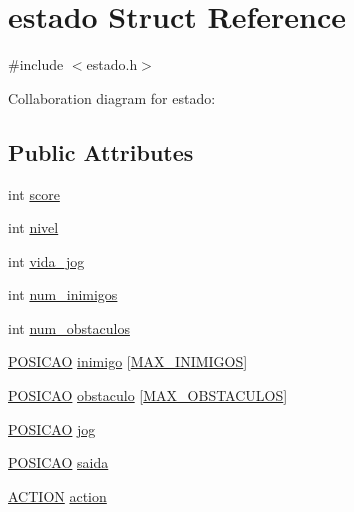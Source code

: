 \hypertarget{structestado}{}\section{estado Struct Reference}
\label{structestado}


{\ttfamily \#include $<$estado.\+h$>$}



Collaboration diagram for estado\+:
\subsection*{Public Attributes}
\begin{DoxyCompactItemize}
\item 
int \hyperlink{structestado_a47e99ef4241dfe72d9d68244a68adb46}{score}
\item 
int \hyperlink{structestado_a6699838dfe62bfa076b99c72d06457d4}{nivel}
\item 
int \hyperlink{structestado_ac8ed787a79a1eb429563efe0ee0c1367}{vida\+\_\+jog}
\item 
int \hyperlink{structestado_a893967d30e93ad8c60dd13219df3f236}{num\+\_\+inimigos}
\item 
int \hyperlink{structestado_abf0a11515468f5843bb6e7c057e022f3}{num\+\_\+obstaculos}
\item 
\hyperlink{estado_8h_a55b3f4b56938eeb8fa5e8f9c07baf1b0}{P\+O\+S\+I\+C\+AO} \hyperlink{structestado_a8f7d47deb337ae082beab6a574ace9e3}{inimigo} \mbox{[}\hyperlink{estado_8h_aa97e6cbfdd94711688f1176cb8dd916a}{M\+A\+X\+\_\+\+I\+N\+I\+M\+I\+G\+OS}\mbox{]}
\item 
\hyperlink{estado_8h_a55b3f4b56938eeb8fa5e8f9c07baf1b0}{P\+O\+S\+I\+C\+AO} \hyperlink{structestado_a970dc20c6687acb17c3f08c06edbed4f}{obstaculo} \mbox{[}\hyperlink{estado_8h_ac574e2817856ecc9a890d2d47cb9d783}{M\+A\+X\+\_\+\+O\+B\+S\+T\+A\+C\+U\+L\+OS}\mbox{]}
\item 
\hyperlink{estado_8h_a55b3f4b56938eeb8fa5e8f9c07baf1b0}{P\+O\+S\+I\+C\+AO} \hyperlink{structestado_abf55d0d40aafdd6829efbc8265b4f724}{jog}
\item 
\hyperlink{estado_8h_a55b3f4b56938eeb8fa5e8f9c07baf1b0}{P\+O\+S\+I\+C\+AO} \hyperlink{structestado_aca05b4bb64bbb53c0dab2dc61971ed91}{saida}
\item 
\hyperlink{estado_8h_a6bf741bba35d152589c909fdcfe6c0cd}{A\+C\+T\+I\+ON} \hyperlink{structestado_a263dff64a1edc816b4adadcdee584545}{action}
\end{DoxyCompactItemize}


